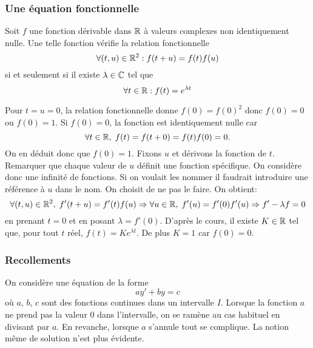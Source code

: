 \subsubsection{Une équation fonctionnelle}
\begin{prop}
 Soit $f$ une fonction dérivable dans $\mathbb{R}$ à valeurs complexes non identiquement nulle.\newline
 Une telle fonction vérifie la relation fonctionnelle
\begin{displaymath}
 \forall(t,u)\in \mathbb{R}^2 : f(t+u) = f(t)f(u)
\end{displaymath}
si et seulement si il existe $\lambda\in \mathbb{C}$ tel que 
\begin{displaymath}
 \forall t\in \mathbb{R} : f(t) = e^{\lambda t}
\end{displaymath}
\end{prop}
\begin{demo}
Pour $t=u=0$, la relation fonctionnelle donne $f(0)=f(0)^2$ donc $f(0)=0$ ou $f(0)=1$.\newline
Si $f(0)=0$, la fonction est identiquement nulle car 
\[
 \forall t \in \mathbb{R}, \; f(t)=f(t+0)= f(t)f(0) = 0.
\]
On en déduit donc que $f(0)=1$.\newline
Fixons $u$ et dérivons la fonction de $t$. Remarquer que chaque valeur de $u$ définit une fonction spécifique. On considère donc une infinité de fonctions. Si on voulait les nommer il faudrait introduire une référence à $u$ dans le nom. On choisit de ne pas le faire. On obtient:
\[
 \forall (t,u) \in \mathbb{R}^2, \; f'(t+u) = f'(t)f(u) \Rightarrow \forall u \in \mathbb{R} ,\; f'(u) = f'(0)f'(u) \Rightarrow f' - \lambda f = 0
\]
en prenant $t=0$ et en posant $\lambda = f'(0)$. D'après le cours, il existe $K\in \mathbb{R}$ tel que, pour tout $t$ réel, $f(t) = K e^{\lambda t}$. De plus $K=1$ car $f(0)=0$.
\end{demo}

\subsubsection{Recollements}
On considère une équation de la forme
\begin{displaymath}
 a y' + b y = c
\end{displaymath}
où $a$, $b$, $c$ sont des fonctions continues dans un intervalle $I$. Lorsque la fonction $a$ ne prend pas la valeur $0$ dans l'intervalle, on se ramène au cas habituel en divisant par $a$. En revanche, lorsque $a$ s'annule tout se complique. La notion même de solution n'est plus évidente.

